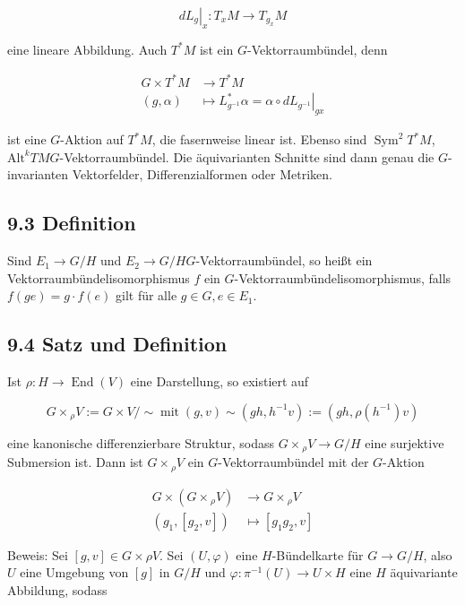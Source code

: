 \documentclass[10pt, letterpaper]{article}
\begin{document}
$$
\left.d L_{g}\right|_{x}: T_{x} M \rightarrow T_{g_{x}} M
$$

eine lineare Abbildung. Auch $T^{*} M$ ist ein $G$-Vektorraumbündel, denn

$$
\begin{aligned}
G \times T^{*} M & \rightarrow T^{*} M \\
(g, \alpha) & \mapsto L_{g^{-1}}^{*} \alpha=\left.\alpha \circ d L_{g^{-1}}\right|_{g x}
\end{aligned}
$$

ist eine $G$-Aktion auf $T^{*} M$, die fasernweise linear ist. Ebenso sind $\operatorname{Sym}^{2} T^{*} M$, $\mathrm{Alt}^{k} T M G$-Vektorraumbündel. Die äquivarianten Schnitte sind dann genau die $G$-invarianten Vektorfelder, Differenzialformen oder Metriken.

\subsection*{9.3 Definition}
Sind $E_{1} \rightarrow G / H$ und $E_{2} \rightarrow G / H G$-Vektorraumbündel, so heißt ein Vektorraumbündelisomorphismus $f$ ein $G$-Vektorraumbündelisomorphismus, falls $f(g e)=g \cdot f(e)$ gilt für alle $g \in G, e \in E_{1}$.

\subsection*{9.4 Satz und Definition}
Ist $\rho: H \rightarrow \operatorname{End}(V)$ eine Darstellung, so existiert auf

$$
G \times{ }_{\rho} V:=G \times V / \sim \operatorname{mit}(g, v) \sim\left(g h, h^{-1} v\right):=\left(g h, \rho\left(h^{-1}\right) v\right)
$$

eine kanonische differenzierbare Struktur, sodass $G \times{ }_{\rho} V \rightarrow G / H$ eine surjektive Submersion ist. Dann ist $G \times{ }_{\rho} V$ ein $G$-Vektorraumbündel mit der $G$-Aktion

$$
\begin{aligned}
G \times\left(G \times{ }_{\rho} V\right) & \rightarrow G \times{ }_{\rho} V \\
\left(g_{1},\left[g_{2}, v\right]\right) & \mapsto\left[g_{1} g_{2}, v\right]
\end{aligned}
$$

Beweis: Sei $[g, v] \in G \times \rho V$. Sei $(U, \varphi)$ eine $H$-Bündelkarte für $G \rightarrow G / H$, also $U$ eine Umgebung von $[g]$ in $G / H$ und $\varphi: \pi^{-1}(U) \rightarrow U \times H$ eine $H$ äquivariante Abbildung, sodass
\end{document}
